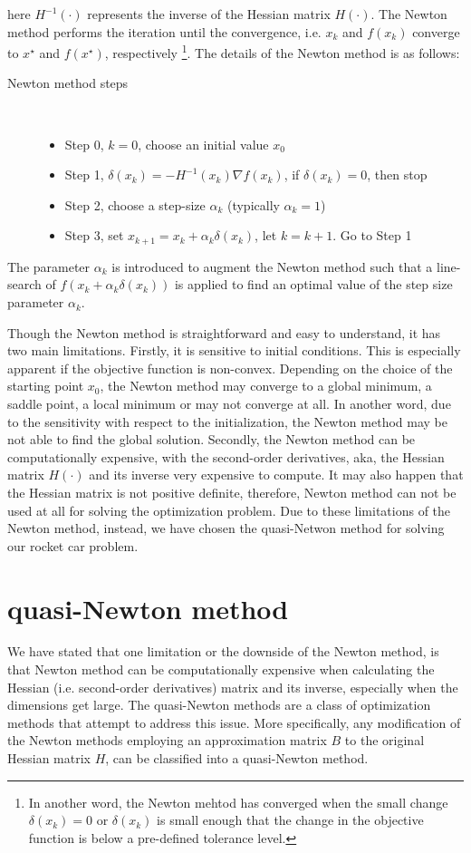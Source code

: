 	here $ H^{-1}(\cdot)$ represents the inverse of the Hessian matrix $H(\cdot)$. The Newton method performs the iteration until the convergence, i.e. $x_k$ and $f(x_k)$ converge to $x^\star$ and $f(x^\star)$, respectively \footnote{In another word, the Newton mehtod has converged when the small change $\delta(x_k) =0$ or $\delta(x_k)$ is small enough that the change in the objective function is below a pre-defined tolerance level.}. The details of the Newton method is as follows: 
	\begin{description}
		\item[Newton method steps]\ 
		\begin{itemize}
			\item Step 0, $k=0$, choose an initial value $x_0$ 
			\item Step 1, $\delta(x_k)  =- H^{-1}(x_k)\nabla f(x_k)$, if $\delta(x_k) =0$, then stop
			\item Step 2, choose a step-size $\alpha_k$ (typically $\alpha_k =1$)
			\item Step 3, set $x_{k+1}  = x_k + \alpha_k \delta(x_k) $, let $k= k+1$. Go to Step 1
		\end{itemize}
	\end{description}
	
	The parameter $\alpha_k$ is introduced to augment the Newton method such that a line-search of $f(x_k + \alpha_k \delta(x_k))$ is applied to find an optimal value of the step size parameter $\alpha_k$. 
	
	Though the Newton method is straightforward and easy to understand, it has two main limitations. Firstly, it is sensitive to initial conditions. This is especially apparent if the objective function is non-convex. Depending on the choice of the starting point $x_0$, the Newton method may converge to a global minimum, a saddle point, a local minimum or may not converge at all. In another word, due to the sensitivity with respect to the initialization, the Newton method may be not able to find the global solution. Secondly, the Newton method can be computationally expensive, with the second-order derivatives, aka, the Hessian matrix $H(\cdot)$ and its inverse very expensive to compute. It may also happen that the Hessian matrix is not positive definite, therefore, Newton method can not be used at all for solving the optimization problem. Due to these limitations of the Newton method, instead, we have chosen the quasi-Netwon method for solving our rocket car problem. 
	
	\section{quasi-Newton method}
	We have stated that one limitation or the downside of the Newton method, is that Newton method can be computationally expensive when calculating the Hessian (i.e. second-order derivatives)  matrix and its inverse, especially when the dimensions get large. The quasi-Newton methods are a class of optimization methods that attempt to address this issue. More specifically, any modification of the Newton methods employing an approximation matrix $B$ to the original Hessian matrix $H$, can be classified into a quasi-Newton method. 
	
